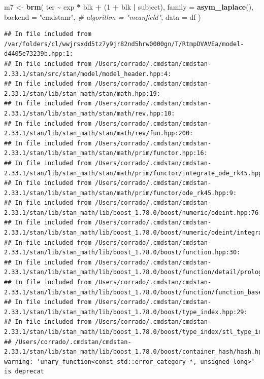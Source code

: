\documentclass[
]{article}
\newenvironment{Shaded}{\begin{snugshade}}{\end{snugshade}}
\newcommand{\AttributeTok}[1]{\textcolor[rgb]{0.13,0.29,0.53}{#1}}
\newcommand{\CommentTok}[1]{\textcolor[rgb]{0.56,0.35,0.01}{\textit{#1}}}
\newcommand{\DecValTok}[1]{\textcolor[rgb]{0.00,0.00,0.81}{#1}}
\newcommand{\FunctionTok}[1]{\textcolor[rgb]{0.13,0.29,0.53}{\textbf{#1}}}
\newcommand{\NormalTok}[1]{#1}
\newcommand{\OtherTok}[1]{\textcolor[rgb]{0.56,0.35,0.01}{#1}}
\newcommand{\SpecialCharTok}[1]{\textcolor[rgb]{0.81,0.36,0.00}{\textbf{#1}}}
\newcommand{\StringTok}[1]{\textcolor[rgb]{0.31,0.60,0.02}{#1}}
\begin{document}
\begin{Shaded}
\begin{Highlighting}[]
\NormalTok{m7 }\OtherTok{\textless{}{-}} \FunctionTok{brm}\NormalTok{(}
\NormalTok{  ter }\SpecialCharTok{\textasciitilde{}}\NormalTok{ exp }\SpecialCharTok{*}\NormalTok{ blk }\SpecialCharTok{+}\NormalTok{ (}\DecValTok{1} \SpecialCharTok{+}\NormalTok{ blk }\SpecialCharTok{|}\NormalTok{ subject),}
  \AttributeTok{family =} \FunctionTok{asym\_laplace}\NormalTok{(),}
  \AttributeTok{backend =} \StringTok{"cmdstanr"}\NormalTok{,}
  \CommentTok{\# algorithm = "meanfield",}
  \AttributeTok{data =}\NormalTok{ df}
\NormalTok{)}
\end{Highlighting}
\end{Shaded}

\begin{verbatim}
## In file included from /var/folders/cl/wwjrsxdd5tz7y9jr82nd5hrw0000gn/T/RtmpDVAVEa/model-d4405e73239b.hpp:1:
## In file included from /Users/corrado/.cmdstan/cmdstan-2.33.1/stan/src/stan/model/model_header.hpp:4:
## In file included from /Users/corrado/.cmdstan/cmdstan-2.33.1/stan/lib/stan_math/stan/math.hpp:19:
## In file included from /Users/corrado/.cmdstan/cmdstan-2.33.1/stan/lib/stan_math/stan/math/rev.hpp:10:
## In file included from /Users/corrado/.cmdstan/cmdstan-2.33.1/stan/lib/stan_math/stan/math/rev/fun.hpp:200:
## In file included from /Users/corrado/.cmdstan/cmdstan-2.33.1/stan/lib/stan_math/stan/math/prim/functor.hpp:16:
## In file included from /Users/corrado/.cmdstan/cmdstan-2.33.1/stan/lib/stan_math/stan/math/prim/functor/integrate_ode_rk45.hpp:6:
## In file included from /Users/corrado/.cmdstan/cmdstan-2.33.1/stan/lib/stan_math/stan/math/prim/functor/ode_rk45.hpp:9:
## In file included from /Users/corrado/.cmdstan/cmdstan-2.33.1/stan/lib/stan_math/lib/boost_1.78.0/boost/numeric/odeint.hpp:76:
## In file included from /Users/corrado/.cmdstan/cmdstan-2.33.1/stan/lib/stan_math/lib/boost_1.78.0/boost/numeric/odeint/integrate/observer_collection.hpp:23:
## In file included from /Users/corrado/.cmdstan/cmdstan-2.33.1/stan/lib/stan_math/lib/boost_1.78.0/boost/function.hpp:30:
## In file included from /Users/corrado/.cmdstan/cmdstan-2.33.1/stan/lib/stan_math/lib/boost_1.78.0/boost/function/detail/prologue.hpp:17:
## In file included from /Users/corrado/.cmdstan/cmdstan-2.33.1/stan/lib/stan_math/lib/boost_1.78.0/boost/function/function_base.hpp:21:
## In file included from /Users/corrado/.cmdstan/cmdstan-2.33.1/stan/lib/stan_math/lib/boost_1.78.0/boost/type_index.hpp:29:
## In file included from /Users/corrado/.cmdstan/cmdstan-2.33.1/stan/lib/stan_math/lib/boost_1.78.0/boost/type_index/stl_type_index.hpp:47:
## /Users/corrado/.cmdstan/cmdstan-2.33.1/stan/lib/stan_math/lib/boost_1.78.0/boost/container_hash/hash.hpp:132:33: warning: 'unary_function<const std::error_category *, unsigned long>' is deprecat
\end{verbatim}
\end{document}
